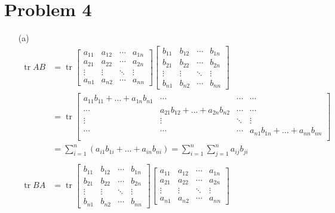 \documentclass{article}
\newcommand*{\problem}[1]{\section*{Problem #1}}
\DeclareMathOperator{\trace}{tr}
\begin{document}
\problem{4}
\begin{itemize}
	\item[(a)]
	\begin{align*}
		\trace AB 
		&=\trace\begin{bmatrix}
			a_{11} & a_{12} & \cdots & a_{1n} \\
			a_{21} & a_{22} & \cdots & a_{2n} \\ 
			\vdots & \vdots & \ddots & \vdots \\
			a_{n1} & a_{n2} & \cdots & a_{nn}
		\end{bmatrix}
		\begin{bmatrix}
			b_{11} & b_{12} & \cdots & b_{1n} \\
			b_{21} & b_{22} & \cdots & b_{2n} \\ 
			\vdots & \vdots & \ddots & \vdots \\
			b_{n1} & b_{n2} & \cdots & b_{nn}
		\end{bmatrix} \\
		&=\trace\begin{bmatrix}
			a_{11}b_{11}+\ldots+a_{1n}b_{n1} & \cdots & \cdots & \cdots \\
			\cdots & a_{21}b_{12}+\ldots+a_{2n}b_{n2} & \cdots & \cdots \\
			\vdots & \vdots & \ddots &\vdots \\
			\cdots & \cdots & \cdots & a_{n1}b_{1n}+\ldots+a_{nn}b_{nn}  \\
		\end{bmatrix} \\
		&=\sum_{i=1}^{n} \left(a_{i1}b_{1i}+\ldots+a_{in}b_{ni}\right)
		=\sum_{i=1}^{n} \sum_{j=1}^{n} a_{ij}b_{ji} \\
		\\
		\trace BA
		&=\trace\begin{bmatrix}
			b_{11} & b_{12} & \cdots & b_{1n} \\
			b_{21} & b_{22} & \cdots & b_{2n} \\ 
			\vdots & \vdots & \ddots & \vdots \\
			b_{n1} & b_{n2} & \cdots & b_{nn}
		\end{bmatrix}
		\begin{bmatrix}
			a_{11} & a_{12} & \cdots & a_{1n} \\
			a_{21} & a_{22} & \cdots & a_{2n} \\ 
			\vdots & \vdots & \ddots & \vdots \\
			a_{n1} & a_{n2} & \cdots & a_{nn}
		\end{bmatrix} \\

\end{align*}
\end{itemize}
\end{document}
